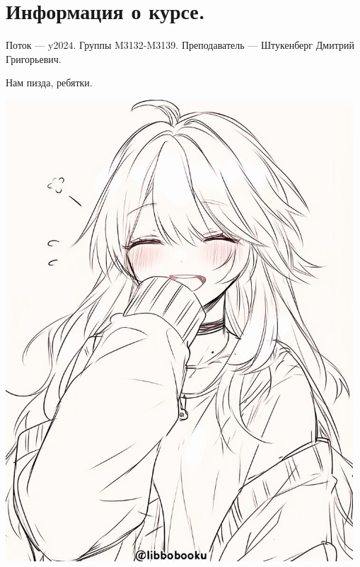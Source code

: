 \section{Информация о курсе.}
Поток — y2024.\newline
Группы M3132-M3139.\newline
Преподаватель --- Штукенберг Дмитрий Григорьевич.\par

Нам пизда, ребятки.
\begin{center}
   \includegraphics[width=13cm]{assets/beat.jpg}
\end{center}